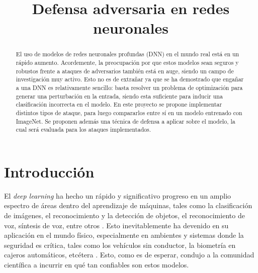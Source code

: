 \documentclass[conference]{IEEEtran}
\begin{document}
\title{Defensa adversaria en redes neuronales}

\author{
\and
{}
}
\maketitle

\begin{abstract} 
El uso de modelos de redes neuronales profundas (DNN) en el mundo real está en un rápido aumento. Acordemente, la preocupación por que estos modelos sean seguros y robustos frente a ataques de adversarios también está en auge, siendo un campo de investigación muy activo. Esto no es de extrañar ya que se ha demostrado que engañar a una DNN es relativamente sencillo: basta resolver un problema de optimización para generar una perturbación en la entrada, siendo esta suficiente para inducir una clasificación incorrecta en el modelo. En este proyecto se propone implementar distintos tipos de ataque, para luego compararlos entre sí en un modelo entrenado con ImageNet. Se proponen además una técnica de defensa a aplicar sobre el modelo, la cual será evaluada para los ataques implementados.
\end{abstract} 

\section{Introducción}
El \textit{deep learning} ha hecho un rápido y significativo progreso en un amplio espectro de áreas dentro del aprendizaje de máquinas, tales como la clasificación de imágenes, el reconocimiento y la detección de objetos, el reconocimiento de voz, síntesis de voz, entre otros \cite{deepdefense}. Esto inevitablemente ha devenido en su aplicación en el mundo físico, especialmente en ambientes y sistemas donde la seguridad es crítica, tales como los vehículos sin conductor, la biometría en cajeros automáticos, etcétera \cite{deepdefense}. Esto, como es de esperar, condujo a la comunidad científica a incurrir en qué tan confiables son estos modelos.
\end{document}
